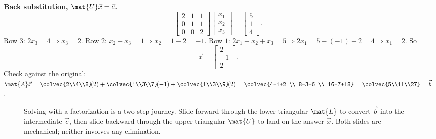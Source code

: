 \textbf{Back substitution, $\mat{U}\vec{x}=\vec{c}$.}
\[
  \begin{bmatrix} 2 & 1 & 1 \\ 0 & 1 & 1 \\ 0 & 0 & 2 \end{bmatrix}
  \begin{bmatrix} x_1 \\ x_2 \\ x_3 \end{bmatrix}
  = \begin{bmatrix} 5 \\ 1 \\ 4 \end{bmatrix}.
\]
Row $3$: $2x_3 = 4 \Rightarrow x_3 = 2$. Row $2$: $x_2 + x_3 = 1 \Rightarrow x_2 = 1 - 2 = -1$.
Row $1$: $2x_1 + x_2 + x_3 = 5 \Rightarrow 2x_1 = 5 - (-1) - 2 = 4 \Rightarrow x_1 = 2$. So
\[
  \vec{x} = \begin{bmatrix} 2 \\ -1 \\ 2 \end{bmatrix}.
\]
Check against the original: $\mat{A}\vec{x} = \colvec{2\\4\\8}\!(2) + \colvec{1\\3\\7}\!(-1)
+ \colvec{1\\3\\9}\!(2) = \colvec{4-1+2 \\ 8-3+6 \\ 16-7+18} = \colvec{5\\11\\27}
= \vec{b}$. \checkmark

\begin{figure}[H]
\centering
{}
\caption{Solving with a factorization is a two-stop journey. Slide forward through the lower
triangular $\mat{L}$ to convert $\vec{b}$ into the intermediate $\vec{c}$, then slide
backward through the upper triangular $\mat{U}$ to land on the answer $\vec{x}$. Both slides
are mechanical; neither involves any elimination.}
\label{ch09:fig-twoslides}
\end{figure}

